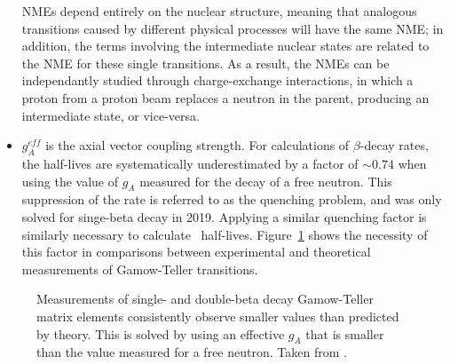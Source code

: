 \documentclass[/main.tex]{subfiles}
\begin{document}
\begin{itemize}
  NMEs depend entirely on the nuclear structure, meaning that analogous transitions caused by different physical processes will have the same NME; in addition, the terms involving the intermediate nuclear states are related to the NME for these single transitions.
  As a result, the NMEs can be independantly studied through charge-exchange interactions, in which a proton from a proton beam replaces a neutron in the parent, producing an intermediate state, or vice-versa.
\item $g^{eff}_A$ is the axial vector coupling strength.
  For calculations of $\beta$-decay rates, the half-lives are systematically underestimated by a factor of ${\sim}0.74$ when using the value of $g_A$ measured for the decay of a free neutron.
  This suppression of the rate is referred to as the quenching problem, and was only solved for singe-beta decay in 2019\cite{Gysbers2019}.
  Applying a similar quenching factor is similarly necessary to calculate \tnbb\ half-lives.
  Figure~\ref{fig:quenching} shows the necessity of this factor in comparisons between experimental and theoretical measurements of Gamow-Teller transitions.
\end{itemize}
\begin{figure}[t]
  \centering
  \caption[$g_A$ Quenching in single- and double-beta decay]{\label{fig:quenching}
    Measurements of single- and double-beta decay Gamow-Teller matrix elements consistently observe smaller values than predicted by theory. This is solved by using an effective $g_A$ that is smaller than the value measured for a free neutron. Taken from \cite{Engel2017}.
  }
\end{figure}
\end{document}
